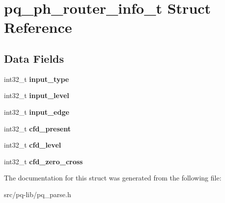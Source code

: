 \hypertarget{structpq__ph__router__info__t}{}\section{pq\+\_\+ph\+\_\+router\+\_\+info\+\_\+t Struct Reference}
\label{structpq__ph__router__info__t}
\subsection*{Data Fields}
\begin{DoxyCompactItemize}
\item 
\hypertarget{structpq__ph__router__info__t_ac66ae0860b90382fad25454ed097e64f}{}int32\+\_\+t {\bfseries input\+\_\+type}\label{structpq__ph__router__info__t_ac66ae0860b90382fad25454ed097e64f}

\item 
\hypertarget{structpq__ph__router__info__t_a26e4b51fc809203d5b8312fb7b9cb07c}{}int32\+\_\+t {\bfseries input\+\_\+level}\label{structpq__ph__router__info__t_a26e4b51fc809203d5b8312fb7b9cb07c}

\item 
\hypertarget{structpq__ph__router__info__t_aef67bc7304dfdd293b31eaefeda311c9}{}int32\+\_\+t {\bfseries input\+\_\+edge}\label{structpq__ph__router__info__t_aef67bc7304dfdd293b31eaefeda311c9}

\item 
\hypertarget{structpq__ph__router__info__t_adc46458e84808cdfdb0bc79d97917f78}{}int32\+\_\+t {\bfseries cfd\+\_\+present}\label{structpq__ph__router__info__t_adc46458e84808cdfdb0bc79d97917f78}

\item 
\hypertarget{structpq__ph__router__info__t_a0b5d66e12c5db337677695b071a1f247}{}int32\+\_\+t {\bfseries cfd\+\_\+level}\label{structpq__ph__router__info__t_a0b5d66e12c5db337677695b071a1f247}

\item 
\hypertarget{structpq__ph__router__info__t_a0ba148b7d37f8035d6c628d991bd8401}{}int32\+\_\+t {\bfseries cfd\+\_\+zero\+\_\+cross}\label{structpq__ph__router__info__t_a0ba148b7d37f8035d6c628d991bd8401}

\end{DoxyCompactItemize}


The documentation for this struct was generated from the following file\+:\begin{DoxyCompactItemize}
\item 
src/pq-\/lib/pq\+\_\+parse.\+h\end{DoxyCompactItemize}
